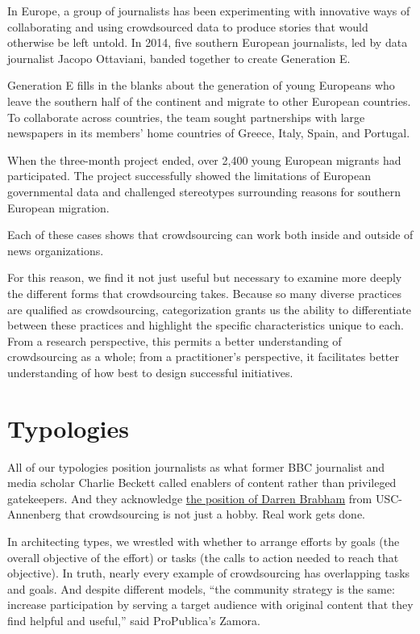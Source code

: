 \documentclass[notoc, symmetric, nobib, nols]{towcenter-guideto-book}
\begin{document}
In Europe, a group of journalists has been experimenting with innovative ways of collaborating and using crowdsourced data to produce stories that would otherwise be left untold. In 2014, five southern European journalists, led by data journalist Jacopo Ottaviani, banded together to create Generation E. 

Generation E fills in the blanks about the generation of young Europeans who leave the southern half of the continent and migrate to other European countries. To collaborate across countries, the team sought partnerships with large newspapers in its members' home countries of Greece, Italy, Spain, and Portugal.%

When the three-month project ended, over 2,400 young European migrants had participated. The project successfully showed the limitations of European governmental data and challenged stereotypes surrounding reasons for southern European migration.\autocite{GE}

Each of these cases shows that crowdsourcing can work both inside and outside of news organizations. 

For this reason, we find it not just useful but necessary to examine more deeply the different forms that crowdsourcing takes. Because so many diverse practices are qualified as crowdsourcing, categorization grants us the ability to differentiate between these practices and highlight the specific characteristics unique to each. From a research perspective, this permits a better understanding of crowdsourcing as a whole; from a practitioner's perspective, it facilitates better understanding of how best to design successful initiatives.

\chapter{Typologies}  

All of our typologies position journalists as what former BBC journalist and media scholar Charlie Beckett called enablers of content rather than privileged gatekeepers.\autocite{Beckett} And they acknowledge \href{https://dbrabham.files.wordpress.com/2012/09/brabham-2012-ics-the-myth-of-amateur-crowds.pdf}{the position of Darren Brabham} from USC-Annenberg that crowdsourcing is not just a hobby. Real work gets done.%

In architecting types, we wrestled with whether to arrange efforts by goals (the overall objective of the effort) or tasks (the calls to action needed to reach that objective). In truth, nearly every example of crowdsourcing has overlapping tasks and goals. And despite different models, ``the community strategy is the same: increase participation by serving a target audience with original content that they find helpful and useful,'' said ProPublica's Zamora.
\end{document}

